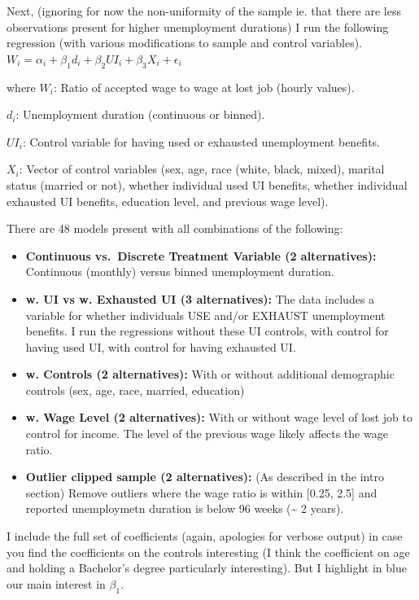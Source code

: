 \documentclass[
]{article}
\begin{document}
Next, (ignoring for now the non-uniformity of the sample ie. that there
are less observations present for higher unemployment durations) I run
the following regression (with various modifications to sample and
control variables).
\(W_{i} = \alpha_{i} + \beta_{1} d_{i} + \beta_{2}UI_{i} + \beta_{3}X_{i} + \epsilon_{i}\)

where \(W_{i}\): Ratio of accepted wage to wage at lost job (hourly
values).

\(d_{i}\): Unemployment duration (continuous or binned).

\(UI_{i}\): Control variable for having used or exhausted unemployment
benefits.

\(X_{i}\): Vector of control variables (sex, age, race (white, black,
mixed), marital status (married or not), whether individual used UI
benefits, whether individual exhausted UI benefits, education level, and
previous wage level).

There are 48 models present with all combinations of the following:

\begin{itemize}
\item
  \textbf{Continuous vs.~Discrete Treatment Variable (2 alternatives):}
  Continuous (monthly) versus binned unemployment duration.
\item
  \textbf{w. UI vs w. Exhausted UI (3 alternatives):} The data includes
  a variable for whether individuals USE and/or EXHAUST unemployment
  benefits. I run the regressions without these UI controls, with
  control for having used UI, with control for having exhausted UI.
\item
  \textbf{w. Controls (2 alternatives):} With or without additional
  demographic controls (sex, age, race, married, education)
\item
  \textbf{w. Wage Level (2 alternatives):} With or without wage level of
  lost job to control for income. The level of the previous wage likely
  affects the wage ratio.
\item
  \textbf{Outlier clipped sample (2 alternatives):} (As described in the
  intro section) Remove outliers where the wage ratio is within {[}0.25,
  2.5{]} and reported unemploymetn duration is below 96 weeks
  (\textasciitilde{} 2 years).
\end{itemize}

I include the full set of coefficients (again, apologies for verbose
output) in case you find the coefficients on the controls interesting (I
think the coefficient on age and holding a Bachelor's degree
particularly interesting). But I highlight in blue our main interest in
\(\beta_{1}\).
\end{document}
